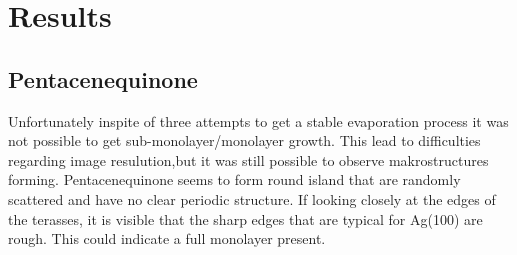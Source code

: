 \chapter{Results}
\section{Pentacenequinone}
Unfortunately inspite of three attempts to get a stable evaporation process it was not possible to get sub-monolayer/monolayer growth.
This lead to difficulties regarding image resulution,but it was still possible to observe makrostructures forming.
Pentacenequinone seems to form round island that are randomly scattered and have no clear periodic structure.
If looking closely at the edges of the terasses, it is visible that the sharp edges that are typical for Ag(100) are rough.
This could indicate a full monolayer present.


